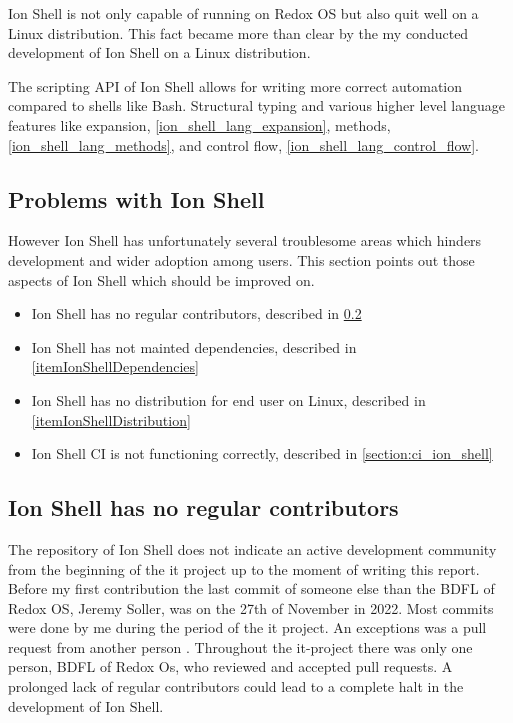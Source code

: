 Ion Shell is not only capable of running on Redox OS but also quit well on a Linux distribution.
This fact became more than clear by the my conducted development of Ion Shell on a Linux distribution.

The scripting API of Ion Shell allows for writing more correct automation compared to shells like Bash.
Structural typing and various higher level language features like expansion, \ref{ion_shell_lang_expansion}, methods, \ref{ion_shell_lang_methods}, and control flow, \ref{ion_shell_lang_control_flow}.

\subsection{Problems with Ion Shell}\label{label:problems_ion_shell}

However Ion Shell has unfortunately several troublesome areas
which hinders development and wider adoption among users.
This section points out those aspects of Ion Shell which should be improved on.

\newcommand{\itemIonShellRegularContributor}{Ion Shell has no regular contributors}
\newcommand{\itemIonShellCI}{Ion Shell CI is not functioning correctly}
\newcommand{\itemIonShellDistribution}{Ion Shell has no distribution for end user on Linux}
\newcommand{\itemIonShellDependencies}{Ion Shell has not mainted dependencies}

\begin{itemize}
	\item \itemIonShellRegularContributor, described in \ref{itemIonShellRegularContributor}
	\item \itemIonShellDependencies, described in \ref{itemIonShellDependencies}
	\item \itemIonShellDistribution, described in \ref{itemIonShellDistribution}
	\item \itemIonShellCI, described in \ref{section:ci_ion_shell}
\end{itemize}

\subsection{\itemIonShellRegularContributor}\label{itemIonShellRegularContributor}

The repository of Ion Shell does not indicate an active development community
from the beginning of the it project up to the moment of writing this report.
Before my first contribution
the last commit of someone else than the BDFL of Redox OS, Jeremy Soller,
was on the 27th of November in 2022.
Most commits were done by me during the period of the it project.
An exceptions was a pull request from another person \cite{pr_ion_shell_global_alias}.
Throughout the it-project there was only one person, BDFL of Redox Os, who reviewed and accepted pull requests.
A prolonged lack of regular contributors could lead to a complete halt in the development of Ion Shell.

